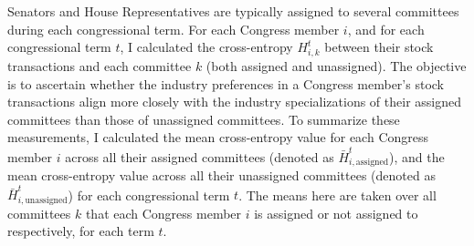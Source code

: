 \documentclass[15pt,letterpaper]{article}
\begin{document}
Senators and House Representatives are typically assigned to several committees during each congressional term. For each Congress member $i$, and for each congressional term $t$, I calculated the cross-entropy $H_{i, k}^t$ between their stock transactions and each committee $k$ (both assigned and unassigned). The objective is to ascertain whether the industry preferences in a Congress member's stock transactions align more closely with the industry specializations of their assigned committees than those of unassigned committees.
To summarize these measurements, I calculated the mean cross-entropy value for each Congress member $i$ across all their assigned committees (denoted as $\bar{H}_{i, \text{assigned}}^t$), and the mean cross-entropy value across all their unassigned committees (denoted as $\bar{H}_{i, \text{unassigned}}^t$) for each congressional term $t$. The means here are taken over all committees $k$ that each Congress member $i$ is assigned or not assigned to respectively, for each term $t$.




\end{document}
